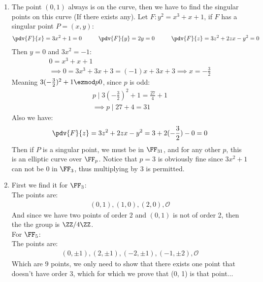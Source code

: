 \begin{enumerate}[label=\ilabel]
    \item 
		The point $(0, 1)$ always is on the curve, then we have to find the singular points on this curve (If there exists any). Let $F: y^2 = x^3 + x + 1$, if $F$ has a singular point $P = (x, y)$:
        \begin{gather*}
            \pdv{F}{x} = 3x^2 + 1 = 0 \hspace{1cm} \pdv{F}{y} = 2y = 0 \hspace{1cm} \pdv{F}{z} = 3z^2 + 2zx - y^2 = 0
        \end{gather*}    
        Then $y  = 0$ and $3x^2 = -1$:
        \begin{gather*}
            0 = x^3 + x + 1 \\
            \implies 0 = 3x^3 + 3x + 3 = (-1)x + 3x + 3  \implies x = -\frac{3}{2}
        \end{gather*}
        Meaning $3 (-\frac{3}{2})^2 + 1 \ezmod p 0$, since $p$ is odd:
        \begin{gather*}
            p \mid 3 (- \frac{3}{2})^2 + 1 = \frac{27}{4} + 1 \\
            \implies p \mid 27 + 4 = 31
        \end{gather*}
        Also we have:
        \begin{gather*}
            \pdv{F}{z} = 3z^2 + 2zx - y^2 = 3 + 2 (- \frac{3}{2}) - 0 = 0
        \end{gather*}
        Then if $P$ is a singular point, we must be in $\FF_{31}$, and for any other $p$, this is an elliptic curve over $\FF_p$. Notice that $p = 3$ is obviously fine since $3x^2 + 1$ can not be 0 in $\FF_3$, thus multiplying by $3$ is permitted.


	\item
		First we find it for $\FF_3$:\\
        The points are:
        \begin{gather*}
            (0, 1), (1, 0), (2, 0), \mathcal O
        \end{gather*}
        And since we have two points of order $2$ and $(0, 1)$ is not of order 2, then the the group is $\ZZ/4\ZZ$. \\
        For $\FF_5$: \\
        The points are:
        \begin{gather*}
            (0, \pm 1), (2, \pm 1), (-2, \pm 1), (-1, \pm 2), \mathcal O
        \end{gather*}
        Which are $9$ points, we only need to show that there exists one point that doesn't have order 3, which for which we prove that (0, 1) is that point...
\end{enumerate}